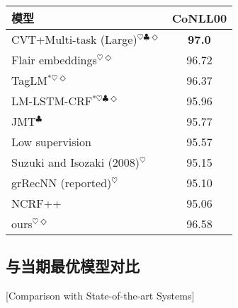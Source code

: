 \begin{table}[t]
	\vspace{0.5em}\centering\wuhao
	\begin{tabular}{lc}
		\toprule[1.5pt]
		模型 & CoNLL00 \\
		\midrule[1pt]
		CVT+Multi-task (Large)$^{\heartsuit\clubsuit\Diamond}$ \cite{clark-EtAl:2018:EMNLP} & \textbf{97.0} \\
		Flair embeddings$^{\heartsuit\Diamond}$ \cite{akbik-blythe-vollgraf:2018:C18-1} & 96.72 \\
		TagLM$^{*\heartsuit\Diamond}$ \cite{peters-EtAl:2017:Long} & 96.37 \\
		LM-LSTM-CRF$^{*\heartsuit\clubsuit\Diamond}$ \cite{Liu2018EmpowerSL} & 95.96 \\
		JMT$^\clubsuit$ \cite{hashimoto-EtAl:2017:EMNLP2017} & 95.77 \\
		Low supervision \cite{sogaard-goldberg:2016:P16-2} & 95.57 \\
		Suzuki and Isozaki (2008)$^\heartsuit$ \cite{suzuki-isozaki:2008:ACLMain} & 95.15 \\
		grRecNN (reported)$^\heartsuit$ \cite{zhuo-EtAl:2016:P16-1} & 95.10 \\
		NCRF++ \cite{yang-zhang:2018:Demos} & 95.06 \\
		\midrule[0.5pt]
		ours$^{\heartsuit\Diamond}$ & 96.58 \\
		\bottomrule[1.5pt]
	\end{tabular}
\end{table}

\subsection{与当期最优模型对比}[Comparison with State-of-the-art Systems]

